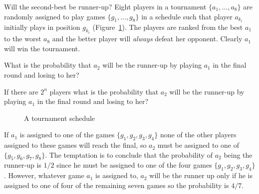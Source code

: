 \begin{prob}{Will the second-best be runner-up?}
Eight players in a tournament $\{a_1,\ldots,a_8\}$ are randomly assigned to play games $\{g_1,\ldots,g_8\}$ in a schedule such that player $a_{k_{i}}$ initially plays in position $g_{k_{i}}$ (Figure~\ref{f.tournament}). The players are ranked from the best $a_1$ to the worst $a_8$ and the better player will \emph{always} defeat her opponent.  Clearly $a_1$ will win the tournament.

 What is the probability that $a_2$ will be the runner-up by playing $a_1$ in the final round and losing to her?

 If there are $2^n$ players what is the probability that $a_2$ will be the runner-up by playing $a_1$ in the final round and losing to her?
\end{prob}
\begin{figure}[tb]
\begin{center}
\end{center}
\caption{A tournament schedule}\label{f.tournament}
\end{figure}

\solution{}

If $a_1$ is assigned to one of the games $\{g_1,g_2,g_3,g_4\}$ none of the other players assigned to these games will reach the final, so $a_2$ must be assigned to one of $\{g_5,g_6,g_7,g_8\}$. The temptation is to conclude that the probability of $a_2$ being the runner-up is $1/2$ since he must be assigned to one of the four games $\{g_1,g_2,g_3,g_4\}$. However, whatever game $a_1$ is  assigned to, $a_2$ will be the runner up only if he is assigned to one of four of the remaining seven games so the probability is $4/7$.

